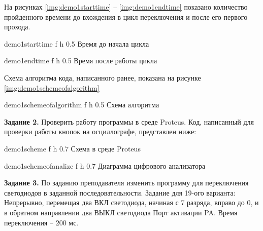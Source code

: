 \documentclass{bmstu}
\begin{document}
На рисунках \ref{img:demo1starttime} -- \ref{img:demo1endtime} показано количество пройденного времени до
вхождения в цикл переключения и после его первого прохода.


    {demo1starttime} %
    {f} %
    {h} %
    {0.5\textwidth} %
    {Время до начала цикла} %

    {demo1endtime} %
    {f} %
    {h} %
    {0.5\textwidth} %
    {Время после работы цикла} %

Схема алгоритма кода, написанного ранее, показана на рисунке \ref{img:demo1schemeofalgorithm}

    {demo1schemeofalgorithm} %
    {f} %
    {h} %
    {0.5\textwidth} %
    {Схема алгоритма} %
    
\newpage

\textbf{Задание 2.}
\newline
Проверить работу программы в среде Proteus.
Код, написанный для проверки работы кнопок на осциллографе,
представлен ниже:

    {demo1scheme} %
    {f} %
    {h} %
    {0.7\textwidth} %
    {Схема в среде Proteus} %

    {demo1schemeofanalize} %
    {f} %
    {h} %
    {0.7\textwidth} %
    {Диаграмма цифрового анализатора} %

\newpage
\textbf{Задание 3.}
\newline
По заданию преподавателя изменить программу для переключения
светодиодов в заданной последовательности.
Задание для 19-ого варианта:
Непрерывно, перемещая два ВКЛ светодиода,
начиная с 7 разряда, вправо до 0,
и в обратном направлении два ВЫКЛ светодиода
Порт активации PA.
Время переключения – 200 мс.
\end{document}
